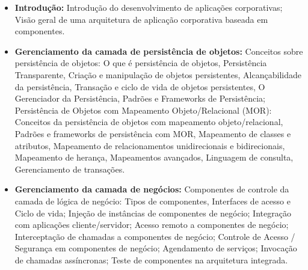 \begin{itemize}

  \item \textbf{Introdução:} Introdução do desenvolvimento de aplicações corporativas;	Visão geral de uma arquitetura de aplicação corporativa baseada em componentes. 
  
  \item \textbf{Gerenciamento da camada de persistência de objetos:} Conceitos sobre persistência de objetos: O que é persistência de objetos, Persistência Transparente, Criação e manipulação de objetos persistentes, Alcançabilidade da persistência, Transação e ciclo de vida de objetos persistentes, O Gerenciador da Persistência, Padrões e Frameworks de Persistência; Persistência de Objetos com Mapeamento Objeto/Relacional (MOR): Conceitos da persistência de objetos com mapeamento objeto/relacional, Padrões e frameworks de persistência com MOR, Mapeamento de classes e atributos, Mapeamento de relacionamentos unidirecionais e bidirecionais, Mapeamento de herança, Mapeamentos avançados, Linguagem de consulta, Gerenciamento de transações.
 
 
  \item \textbf{Gerenciamento da camada de negócios:} Componentes de controle da camada de lógica de negócio: Tipos de componentes, Interfaces de acesso e Ciclo de vida; Injeção de instâncias de componentes de negócio; Integração com aplicações cliente/servidor; Acesso remoto a componentes de negócio; Interceptação de chamadas a componentes de negócio; Controle de Acesso / Segurança em componentes de negócio; Agendamento de serviços; Invocação de chamadas assíncronas; Teste de componentes na arquitetura integrada.

\end{itemize}




